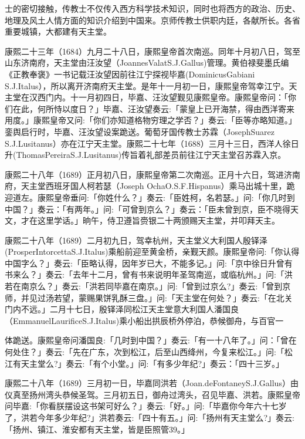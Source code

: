\noindent 士的密切接触，传教士不仅传入西方科学技术知识，同时也将西方的政治、历史、地理及风土人情方面的知识介绍到中国来。京师传教士供职内廷，各献所长。各省重要城镇，大都建有天主堂。

康熙二十三年（1684）九月二十八日，康熙皇帝首次南巡。同年十月初八日，驾至山东济南府，天主堂由汪汝望（JoannesValatS.J.Gallus)管理。黄伯禄斐墨氏编《正教奉褒》一书记载汪汝望因前往江宁探视毕嘉(DominicusGabiani S.J.Italus），所以离开济南府天主堂。是年十一月初一日，康熙皇帝驾幸江宁。天主堂在汉西门内。十一月初四日，毕嘉、汪汝望觐见康熙皇帝。康熙皇帝问：「你们在此，何所恃以度日？」毕嘉、汪汝望奏云:「蒙皇上已开海禁，得由西洋寄来用度。」康熙皇帝又问:「你们亦知道格物穷理之学否？」奏云:「臣等亦略知道。」銮舆启行时，毕嘉、汪汝望设案跪送。葡萄牙国传教士苏霖（JosephSuarez S.J.Lusitanus）亦在江宁天主堂。康熙二十七年（1688）三月十三日，西洋人徐日升(ThomasPereiraS.J.Lusitanus)传旨着礼部差员前往江宁天主堂召苏霖入京。

康熙二十八年（1689）正月初八日，康熙皇帝第二次南巡。正月十六日，驾进济南府，天主堂西班牙国人柯若瑟（Joseph OchaO.S.F.Hispanus）乘马出城十里，跪迎道左。康熙皇帝垂问:「你姓什么？」奏云:「臣姓柯，名若瑟。」问:「你几时到中国？」奏云：「有两年。」问:「可曾到京么？」奏云：「臣未曾到京，臣不晓得天文，才在这里学话。」晌午，侍卫遵旨赍银二十两颁赐天主堂，并叩拜天主。

康熙二十八年（1689）二月初九日，驾幸杭州，天主堂义大利国人殷铎泽(ProsperIntorcettaS.J.Italus)乘船前迎至黄金桥，亲觐天颜。康熙皇帝问:「你认得中国字么？」奏云:「臣略认得，因年岁已大，不能多记。」问:「京中徐日升曾有书来么？」奏云:「去年十二月，曾有书来说明年圣驾南巡，或临杭州。」问:「洪若在南京么？」奏云:「洪若同毕嘉在南京。」问:「曾到过京么?」奏云:「曾到京师，并见过汤若望，蒙赐果饼乳酥三盘。」问:「天主堂在何处？」奏云:「在北关门内不远。」二月十七日，殷铎泽同松江天主堂意大利国人潘国良（EmmanuelLaurificeS.J.Italus)乘小船出拱辰桥外停泊，恭候御舟，与百官一


\noindent 体跪送。康熙皇帝问潘国良:「几时到中国？」奏云:「有一十八年了。」问：「曾在何处住？」奏云:「先在广东，次到松江，后至山西绛州，今复来松江。」问:「松江有天主堂么?」奏云:「有个小堂。」问:「有多少年纪?」奏云：「四十三岁。」

康熙二十八年（1689）三月初一日，毕嘉同洪若（Joan.deFontaneyS.J.Gallus）由仪真至扬州湾头恭候圣驾。三月初五日，御舟过湾头，召见毕嘉、洪若。康熙皇帝问毕嘉:「你看朕摆设这书架可好么？」奏云:「好。」问:「毕嘉你今年六十七岁了，洪若今年多少年纪?」洪若奏云:「四十有五。」问:「扬州有天主堂么?」奏云:「扬州、镇江、淮安都有天主堂，皆是臣照管39。」

